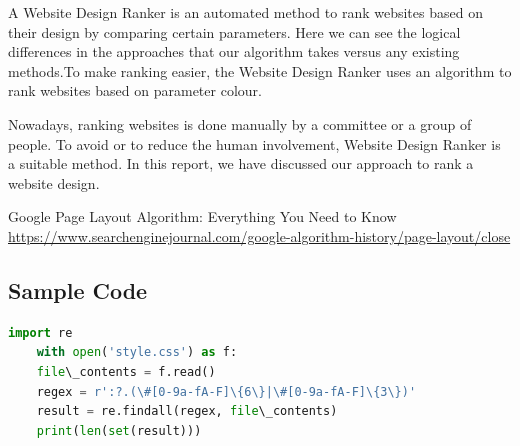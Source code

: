 \documentclass{fisatproject}
\begin{document}
A Website Design Ranker is an automated method to rank websites based on their design by comparing certain parameters. Here we can see the logical differences in the approaches that our algorithm takes versus any existing methods.To make ranking easier, the Website Design Ranker uses an algorithm to rank websites based on parameter colour.

Nowadays, ranking websites is done manually by a committee or a group of people. To avoid or to reduce the human involvement, Website Design Ranker is a suitable method. In this report, we have discussed our approach to rank a website design.



\begin{thebibliography}{1}
 Google Page Layout Algorithm: Everything You Need to
Know
 \url{https://www.searchenginejournal.com/google-algorithm-history/page-layout/close}

\end{thebibliography}

\begin{appendices}
\chapter{Sample Code}
\begin{lstlisting}[language=python]
	import re
	with open('style.css') as f:
	file\_contents = f.read()
	regex = r':?.(\#[0-9a-fA-F]\{6\}|\#[0-9a-fA-F]\{3\})'
	result = re.findall(regex, file\_contents)
	print(len(set(result)))

\end{lstlisting}
\end{appendices}
\end{document}
